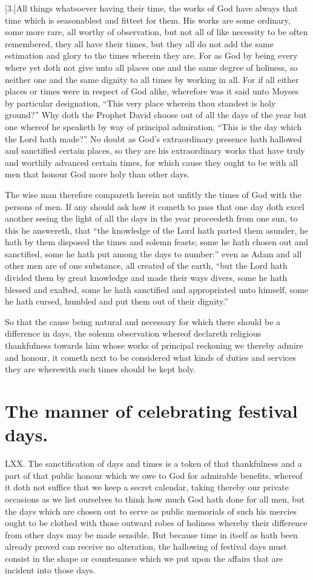 [3.]All things whatsoever having their time, the works of God have always that time which is seasonablest and fittest for them. His works are some ordinary, some more rare, all worthy of observation, but not all of like necessity to be often remembered, they all have their times, but they all do not add the same estimation and glory to the times wherein they are. For as God by being every where yet doth not give unto all places one and the same degree of holiness, so neither one and the same dignity to all times by working in all. For if all either places or times were in respect of God alike, wherefore was it said unto Moyses by particular designation, “This very place wherein thou standest is holy ground?” Why doth the Prophet David choose out of all the days of the year but one whereof he speaketh by way of principal admiration, “This is the day which the Lord hath made?” No doubt as God’s extraordinary presence hath hallowed and sanctified certain places, so they are his extraordinary works that have truly and worthily advanced certain times, for  which cause they ought to be with all men that honour God more holy than other days.

The wise man therefore compareth herein not unfitly the times of God with the persons of men. If any should ask how it cometh to pass that one day doth excel another seeing the light of all the days in the year proceedeth from one sun, to this he answereth, that “the knowledge of the Lord hath parted them asunder, he hath by them disposed the times and solemn feasts; some he hath chosen out and sanctified, some he hath put among the days to number:” even as Adam and all other men are of one substance, all created of the earth, “but the Lord hath divided them by great knowledge and made their ways divers, some he hath blessed and exalted, some he hath sanctified and appropriated unto himself, some he hath cursed, humbled and put them out of their dignity.”

So that the cause being natural and necessary for which there should be a difference in days, the solemn observation whereof declareth religious thankfulness towards him whose works of principal reckoning we thereby admire and honour, it cometh next to be considered what kinds of duties and services they are wherewith such times should be kept holy.


\section*{The manner of celebrating festival days.}
LXX. The sanctification of days and times is a token of that thankfulness and a part of that public honour which we owe to God for admirable benefits, whereof it doth not suffice that we keep a secret calendar, taking thereby our private occasions as we list ourselves to think how much God hath done for all men, but the days which are chosen out to serve as public memorials of such his mercies ought to be clothed with those outward robes of holiness whereby their difference from other days may be made sensible. But because time in itself as hath been already proved can receive no alteration, the hallowing of festival days must consist in the shape or countenance which we put upon the affairs that are incident into those days.

